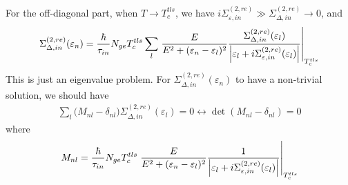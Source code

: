 \documentclass[]{article}
\begin{document}
For the off-diagonal part, when $T \rightarrow T_c^{tls}$,
we have $i\Sigma_{\varepsilon,in}^{(2,re)} \gg \Sigma_{\Delta,in}^{(2,re)} \rightarrow 0$, and
\begin{align}
    \Sigma_{\Delta,in}^{(2,re)}(\varepsilon_n)
    = \frac{\hbar}{\tau_{in}}N_{ge}T_c^{tls}\sum_l\eval{\frac{E}{E^2+(\varepsilon_n-\varepsilon_l)^2}
    \frac{\Sigma_{\Delta,in}^{(2,re)}(\varepsilon_l)}
    {\left|\varepsilon_l + i\Sigma_{\varepsilon,in}^{(2,re)}(\varepsilon_l)\right|}}_{T_c^{tls}} \label{eq:off-diagonal}
\end{align}
This is just an eigenvalue problem. For $\Sigma_{\Delta,in}^{(2,re)}(\varepsilon_n)$ to have a non-trivial solution,
we should have
\begin{align}
    \sum_l \bigg(M_{nl} - \delta_{nl}\bigg) \Sigma_{\Delta,in}^{(2,re)}(\varepsilon_l) = 0
    \leftrightarrow
    \det(M_{nl} - \delta_{nl}) = 0
\end{align}
where
\begin{align}
    M_{nl} = 
    \frac{\hbar}{\tau_{in}}N_{ge}T_c^{tls}\eval{\frac{E}{E^2+(\varepsilon_n-\varepsilon_l)^2}
    \frac{1}{\left|\varepsilon_l + i\Sigma_{\varepsilon,in}^{(2,re)}(\varepsilon_l)\right|}}_{T_c^{tls}}
\end{align}
\end{document}
